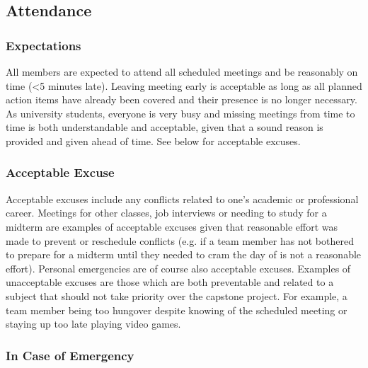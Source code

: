 \documentclass{article}
\begin{document}
\subsection*{Attendance}

\subsubsection*{Expectations}


\par{All members are expected to attend all scheduled meetings and be reasonably on time (<5 minutes late). Leaving meeting early is acceptable as long
as all planned action items have already been covered and their presence is no longer necessary. As university students, everyone is very busy and missing
meetings from time to time is both understandable and acceptable, given that a sound reason is provided and given ahead of time. See below for acceptable excuses.}

\subsubsection*{Acceptable Excuse}


\par{Acceptable excuses include any conflicts related to one's academic or professional career. Meetings for other classes, job interviews or
needing to study for a midterm are examples of acceptable excuses given that reasonable effort was made to prevent or reschedule conflicts (e.g. if a team member
has not bothered to prepare for a midterm until they needed to cram the day of is not a reasonable effort). Personal emergencies are of course also acceptable
excuses. Examples of unacceptable excuses are those which are both preventable and related to a subject that should not take priority over the capstone project.
For example, a team member being too hungover despite knowing of the scheduled meeting or staying up too late playing video games.}

\subsubsection*{In Case of Emergency}
\end{document}
